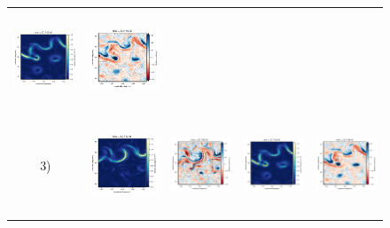 \documentclass[draft]{agujournal2019}
\begin{document}
\begin{figure}[H]
\begin{center}
\begin{tabular}{ccccc}
 \includegraphics[trim={13mm 13mm 22mm 5mm},clip, width=2.9cm,height=2.9cm]{figures/plots/glorys12-f_rec_ke.png} &
 \includegraphics[trim={13mm 13mm 22mm 5mm},clip,width=2.9cm,height=2.9cm]{figures/plots/glorys12-f_rec_vort_r.png} \\
\hspace{-10mm} 3) &
 \includegraphics[trim={0 13mm 22mm 5mm},clip, width=3.3cm,height=2.9cm]{figures/plots/glorys12-r_train_ke.png} &
 \includegraphics[trim={13mm 13mm 22mm 5mm},clip, width=2.9cm,height=2.9cm]{figures/plots/glorys12-r_train_vort_r.png} &
 \includegraphics[trim={13mm 13mm 22mm 5mm},clip, width=2.9cm,height=2.9cm]{figures/plots/glorys12-r_rec_ke.png} &
 \includegraphics[trim={13mm 13mm 22mm 5mm},clip,width=2.9cm,height=2.9cm]{figures/plots/glorys12-r_rec_vort_r.png} \\

\end{tabular}
\end{center}
\end{figure}
\end{document}
